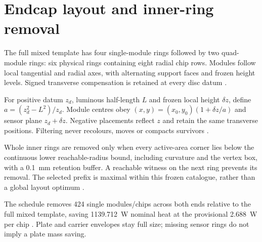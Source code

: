 \begin{table}[htbp]
\caption{Unchanged barrel inventory from the frozen DES013 packed layout.
Radius denotes the nominal layer datum, not every staggered sensor plane;
the last column bounds the actual active-area extent \cite{barrel}.}
\label{tab:pixel-barrel}
\centering\footnotesize

\end{table}

\section{Endcap layout and inner-ring removal}
The full mixed template has four single-module rings followed by two quad-module
rings: six physical rings containing eight radial chip rows. Modules follow local
tangential and radial axes, with alternating support faces and frozen height
levels. Signed transverse compensation is retained at every disc datum
\cite{mixed,model}.

For positive datum $z_d$, luminous half-length $L$ and frozen local height
$\delta z$, define $a=(z_d^2-L^2)/z_d$. Module centres obey
$(x,y)=(x_0,y_0)(1+\delta z/a)$ and sensor plane $z_d+\delta z$.
Negative placements reflect $z$ and retain the same transverse positions.
Filtering never recolours, moves or compacts survivors \cite{mixed,trim,model}.

Whole inner rings are removed only when every active-area corner lies below
the continuous lower reachable-radius bound, including curvature and the vertex
box, with a \qty{0.1}{\milli\metre} retention buffer. A reachable witness
on the next ring prevents its removal. The selected prefix is maximal within
this frozen catalogue, rather than a global layout optimum \cite{trim}.

\begin{table}[htbp]
\caption{Trimmed mixed endcap at each end. Displayed datums are rounded to
\qty{0.001}{\milli\metre}; DD4hep retains source precision. Ring numbers
refer to the original template. Generated from DES017/018 \cite{mixed,trim}.}
\label{tab:pixel-discs}
\centering\footnotesize

\end{table}

The schedule removes \num{424} single modules/chips across both ends relative
to the full mixed template, saving \qty{1139.712}{\watt} nominal heat at the
provisional \qty{2.688}{\watt} per chip \cite{mixed,trim}. Plate and carrier
envelopes stay full size; missing sensor rings do not imply a plate mass saving.

